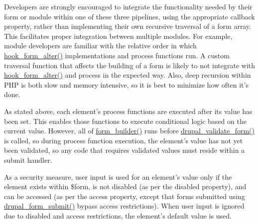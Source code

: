 Developers are strongly encouraged to integrate the functionality needed by their form or module within one of these three pipelines, using the appropriate callback property, rather than implementing their own recursive traversal of a form array. This facilitates proper integration between multiple modules. For example, module developers are familiar with the relative order in which \hyperlink{group__hooks_ga6df3cea27ae1407aeef4eae5444cb213}{hook\_\-form\_\-alter()} implementations and process functions run. A custom traversal function that affects the building of a form is likely to not integrate with \hyperlink{group__hooks_ga6df3cea27ae1407aeef4eae5444cb213}{hook\_\-form\_\-alter()} and process in the expected way. Also, deep recursion within PHP is both slow and memory intensive, so it is best to minimize how often it's done.

As stated above, each element's process functions are executed after its value has been set. This enables those functions to execute conditional logic based on the current value. However, all of \hyperlink{group__form__api_gae839323ba1c81ba86030b496fee24f7d}{form\_\-builder()} runs before \hyperlink{group__form__api_ga05a4aea7c6aa28db24a5f96da6948f34}{drupal\_\-validate\_\-form()} is called, so during process function execution, the element's value has not yet been validated, so any code that requires validated values must reside within a submit handler.

As a security measure, user input is used for an element's value only if the element exists within \$form, is not disabled (as per the disabled property), and can be accessed (as per the access property, except that forms submitted using \hyperlink{group__form__api_ga4312d7fe0602f6359153fc62cba1ca24}{drupal\_\-form\_\-submit()} bypass access restrictions). When user input is ignored due to disabled and access restrictions, the element's default value is used.

